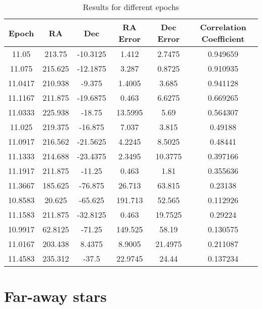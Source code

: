\begin{table}[h!]
	\centering
	\def\arraystretch{1.2}
	\begin{tabular}{|c c c c c c|} 
		\hline
		\textbf{Epoch} & RA & Dec & RA Error & Dec Error & Correlation Coefficient \\ [0.5ex] 
		\hline\hline
		11.05 & 213.75 & -10.3125 & 1.412 & 2.7475 & 0.949659 \\ 
		\hline
		11.075 & 215.625 & -12.1875 & 3.287 & 0.8725 & 0.910935 \\ 
		\hline
		11.0417 & 210.938 & -9.375 & 1.4005 & 3.685 & 0.941128 \\ 
		\hline
		11.1167 & 211.875 & -19.6875 & 0.463 & 6.6275 & 0.669265 \\ 
		\hline
		11.0333 & 225.938 & -18.75 & 13.5995 & 5.69 & 0.564307 \\ 
		\hline
		11.025 & 219.375 & -16.875 & 7.037 & 3.815 & 0.49188 \\ 
		\hline
		11.0917 & 216.562 & -21.5625 & 4.2245 & 8.5025 & 0.48441 \\ 
		\hline
		11.1333 & 214.688 & -23.4375 & 2.3495 & 10.3775 & 0.397166 \\ 
		\hline
		11.1917 & 211.875 & -11.25 & 0.463 & 1.81 & 0.355636 \\ 
		\hline
		11.3667 & 185.625 & -76.875 & 26.713 & 63.815 & 0.23138 \\ 
		\hline
		10.8583 & 20.625 & -65.625 & 191.713 & 52.565 & 0.112926 \\ 
		\hline
		11.1583 & 211.875 & -32.8125 & 0.463 & 19.7525 & 0.29224 \\ 
		\hline
		10.9917 & 62.8125 & -71.25 & 149.525 & 58.19 & 0.130575 \\ 
		\hline
		11.0167 & 203.438 & 8.4375 & 8.9005 & 21.4975 & 0.211087 \\ 
		\hline
		11.4583 & 235.312 & -37.5 & 22.9745 & 24.44 & 0.137234 \\
		\hline
	\end{tabular}
	\caption{Results for different epochs}
\end{table}




\section{Far-away stars}
